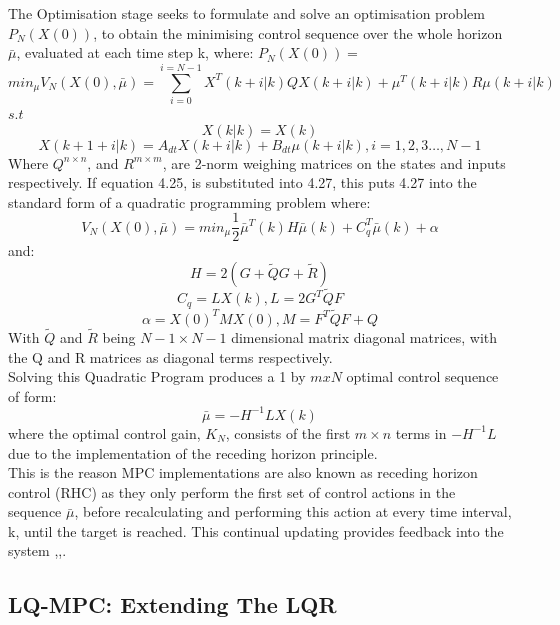 \documentclass[12pt,a4paper,twoside]{report}
\begin{document}
				\space
				The Optimisation stage seeks to formulate and solve an optimisation problem \(P_N(X(0))\), to obtain the minimising control sequence over the whole horizon $\bar{\mu}$, evaluated at each time step k, where:
				\(P_N(X(0)) = \)				
				\begin{equation}
					min_\mu  V_N(X(0),\bar{\mu}) = \sum_{i = 0}^{i = N-1} X^{T}(k+i|k) Q X(k+i|k) + \mu^{T}(k+i|k) R \mu(k+i|k)
				\end{equation}
				\(s.t\)
				\[
					X(k|k) = X(k)
				\]
				\[
					X(k+1+i|k) = A_{dt}X(k+i|k) + B_{dt} \mu(k+i|k) , i=1,2,3\dots,N-1
				\]
				Where $Q^{n \times n}$, and $R^{m \times m}$, are 2-norm weighing matrices on the states and inputs respectively. If equation 4.25, is substituted into 4.27, this puts 4.27 into the standard form of a quadratic programming problem where:
				\begin{equation}
					V_N(X(0),\bar{\mu}) = min_\mu \frac{1}{2} \bar{\mu}^{T}(k) H \bar{\mu}(k) + C_q^{T}\bar{\mu}(k) + \alpha
				\end{equation}
				and:
					\[H = 2(G + \tilde{Q}G + \tilde{R})\]
					\[C_q = L X(k) , L = 2 G^{T} \tilde{Q} F\]
				\begin{equation}
					\alpha = X(0)^{T} M X(0), M = F^{T} \tilde{Q} F + Q
				\end{equation}
				With \( \tilde{Q} \) and \(\tilde{R}\) being \(N-1 \times N-1\) dimensional matrix diagonal matrices, with the Q and R matrices as diagonal terms respectively.
				\\
				Solving this Quadratic Program produces a 1 by $mxN$ optimal control sequence of form:
				\begin{equation}
					\bar{\mu }= -H^{-1} L X(k)
				\end{equation}
				where the optimal control gain, $K_N$, consists of the first $m \times n$ terms in $-H^{-1} L$ due to the implementation of the receding horizon principle. 
				\\
				This is the reason MPC implementations are also known as receding horizon control (RHC) as they only perform the first set of control actions in the sequence $\bar{\mu}$, before recalculating and performing this action at every time interval, k, until the target is reached. This continual updating provides feedback into the system \cite{25},\cite{26},\cite{27}. 
				
			\subsection{LQ-MPC: Extending The LQR}
				
\end{document}
